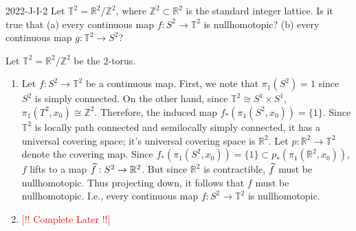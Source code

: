 \documentclass{article}
\newcommand{\complete}{\textcolor{red}{[!! Complete Later !!]}}
\begin{document}
	\begin{prb}{2022-J-I-2}
		Let $\mathbb{T}^{2} = \mathbb{R}^2/\mathbb{Z}^2$, where $\mathbb{Z}^2 \subset \mathbb{R}^2$ is the standard integer lattice. Is it true that (a) every continuous map $f: S^2 \to \mathbb{T}^2$ is nullhomotopic? (b) every continuous map $g: \mathbb{T}^2 \to S^{2}$?
	\end{prb}
	Let $\mathbb{T}^2 = \mathbb{R}^2/\mathbb{Z}^{2}$ be the $2$-torus. \vspace{-0.25cm}
	\begin{enumerate}[itemsep=-2pt,label = (\alph{*})]
		\item Let $f: S^{2} \to \mathbb{T}^{2}$ be a continuous map. First, we note that $\pi_{1}(S^2) = 1$ since $S^2$ is simply connected. On the other hand, since $\mathbb{T}^{2} \cong S^1 \times S^1$, $\pi_1(T^2, x_0) \cong \mathbb{Z}^2$. Therefore, the induced map $f_\ast(\pi_1(S^2,x_0)) = \{1\}$. Since $\mathbb{T}^2$ is locally path connected and semilocally simply connected, it has a universal covering space; it's universal covering space is $\mathbb{R}^2$. Let $p: \mathbb{R}^2 \to \mathbb{T}^2$ denote the covering map. Since $f_{\ast}(\pi_1(S^2,x_0)) = \{1\} \subset p_\ast(\pi_1(\mathbb{R}^2, x_0))$, $f$ lifts to a map $\widetilde{f}: S^2 \to \mathbb{R}^2$. But since $\mathbb{R}^{2}$ is contractible, $\widetilde{f}$ must be nullhomotopic. Thus projecting down, it follows that $f$ must be nullhomotopic. I.e., every continuous map $f: S^2 \to \mathbb{T}^2$ is nullhomotopic. 
		\item \complete 
	\end{enumerate}
	
\end{document}
